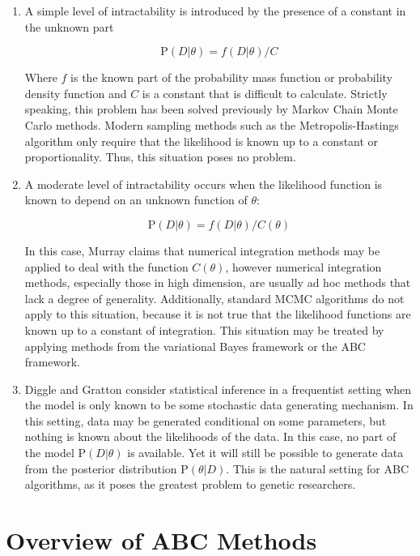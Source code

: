 \documentclass[12pt]{article}
\begin{document}
\begin{enumerate}
\item A simple level of intractability is introduced by the presence of a constant in the unknown part 

$$ \mathrm{P} (D | \theta) = f(D | \theta) / C $$

Where $f$ is the known part of the probability mass function or probability density function and $C$ is a constant that is difficult to calculate. Strictly speaking, this problem has been solved previously by Markov Chain Monte Carlo methods. Modern sampling methods such as the Metropolis-Hastings algorithm only require that the likelihood is known up to a constant or proportionality. Thus, this situation poses no problem.

\item A moderate level of intractability occurs when the likelihood function is known to depend on an unknown function of $\theta$: 

$$ \mathrm{P} (D | \theta) = f( D | \theta) / C ( \theta)$$

In this case, Murray claims that numerical integration methods may be applied to deal with the function $C(\theta)$, however numerical integration methods, especially those in high dimension, are usually ad hoc methods that lack a degree of generality. Additionally, standard MCMC algorithms do not apply to this situation, because it is not true that the likelihood functions are known up to a constant of integration. This situation may be treated by applying methods from the variational Bayes framework or the ABC framework.

\item  Diggle and Gratton \cite{diggle} consider statistical inference in a frequentist setting when the model is only known to be some stochastic data generating mechanism. In this setting, data may be generated conditional on some parameters, but nothing is known about the likelihoods of the data. In this case, no part of the model $\mathrm{P} (D | \theta)$ is available. Yet it will still be possible to generate data from the posterior distribution $\mathrm{P} ( \theta | D)$. This is the natural setting for ABC algorithms, as it poses the greatest problem to genetic researchers. 
\end{enumerate}

\section{Overview of ABC Methods}
\end{document}

